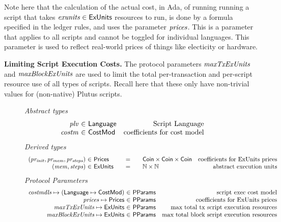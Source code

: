 Note here that the calculation of the actual cost, in Ada, of running
running a script that takes $\mathit{exunits} \in \mathsf{ExUnits}$ resources to run,
is done by a formula specified in the ledger rules, and uses the parameter
$\mathit{prices}$. This is a parameter that applies to all
scripts and cannot be toggled for individual languages. This parameter is
used to reflect real-world prices of things like electicity or hardware.

\textbf{Limiting Script Execution Costs.}
The protocol parameters $\mathit{maxTxExUnits}$ and $\mathit{maxBlockExUnits}$ are
used to limit the total per-transaction and per-script resource use of all
types of scripts. Recall here that these only have non-trivial values for
(non-native) Plutus scripts.

\begin{figure*}[htb]
  \emph{Abstract types}
  \begin{equation*}
    \begin{array}{r@{~\in~}lr}
      \var{plv} & \Language
      & \text{Script Language}
      \\
      \var{costm} & \CostMod & \text{coefficients for cost model} \\
    \end{array}
  \end{equation*}
  \emph{Derived types}
  \begin{equation*}
    \begin{array}{r@{~\in~}l@{\qquad=\qquad}lr}
      \var{(pr_{init}, pr_{mem}, pr_{steps})}
      & \Prices
      & \Coin \times \Coin \times \Coin
      & \text {coefficients for ExUnits prices}
      \\
      \var{(mem, steps)}
      & \ExUnits
      & \N \times \N
      & \text{abstract execution units} \\
    \end{array}
  \end{equation*}
  \emph{Protocol Parameters}
  \begin{equation*}
      \begin{array}{r@{~\in~}lr}
        \var{costmdls} \mapsto (\Language \mapsto \CostMod) & \PParams & \text{script exec cost model}\\
        \var{prices} \mapsto \Prices & \PParams & \text{coefficients for ExUnits prices} \\
        \var{maxTxExUnits} \mapsto \ExUnits & \PParams & \text{max total tx script execution resources}\\
        \var{maxBlockExUnits} \mapsto \ExUnits & \PParams & \text{max total block script execution resources}\\

\end{array}
\end{equation*}
\end{figure*}
